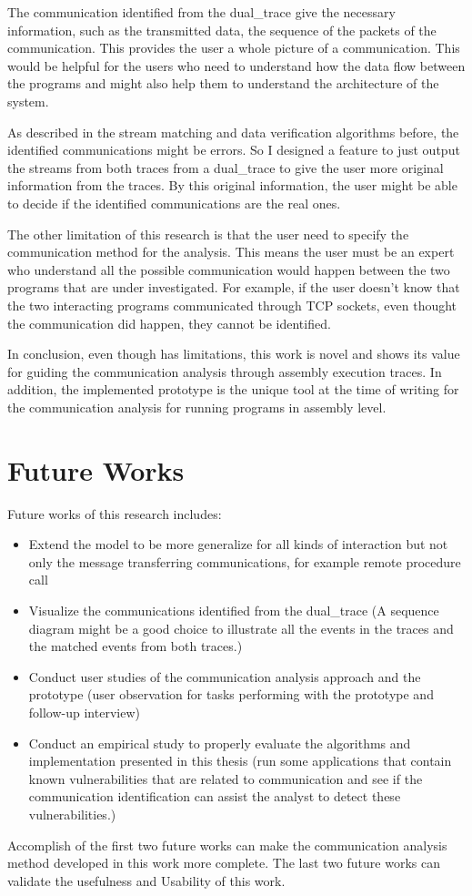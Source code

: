 The communication identified from the dual\_trace give the necessary information, such as the transmitted data, the sequence of the packets of the communication. This provides the user a whole picture of a communication. This would be helpful for the users who need to understand how the data flow between the programs and might also help them to understand the architecture of the system. 

As described in the stream matching and  data verification algorithms before, the identified communications might be errors. So I designed a feature to just output the streams from both traces from a dual\_trace to give the user more original information from the traces. By this original information, the user might be able to decide if the identified communications are the real ones.

The other limitation of this research is that the user need to specify the communication method for the analysis. This means the user must be an expert who understand all the possible communication would happen between the two programs that are under investigated. For example, if the user doesn't know that the two interacting programs communicated through TCP sockets, even thought the communication did happen, they cannot be identified. 

In conclusion, even though has limitations, this work is novel and shows its value for guiding the communication analysis through assembly execution traces. In addition, the implemented prototype is the unique tool at the time of writing for the communication analysis for running programs in assembly level.

\section{Future Works}

Future works of this research includes:
\begin{itemize}
\item Extend the model to be more generalize for all kinds of interaction but not only the message transferring communications, for example remote procedure call
\item Visualize the communications identified from the dual\_trace (A sequence diagram might be a good choice to illustrate all the events in the traces and the matched events from both traces.) 
\item Conduct user studies of the communication analysis approach and the prototype (user observation for tasks performing with the prototype and follow-up interview)
\item Conduct an empirical study to properly evaluate the algorithms and implementation presented in this thesis (run some applications that contain known vulnerabilities that are related to communication and see if the communication identification can assist the analyst to detect these vulnerabilities.)
\end{itemize}

Accomplish of the first two future works can make the communication analysis method developed in this work more complete. The last two future works can validate the usefulness and Usability of this work.


